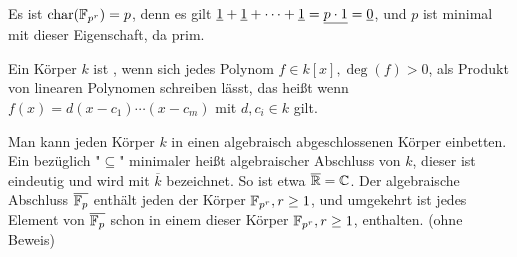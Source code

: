\begin{bem}
	Es ist $\operatorname{char}(\mathbb{F}_{p^r}) = p$, denn es gilt $\uline{1} + \uline{1} + \dots + \uline{1} = \uline{p \cdot 1} = \uline{0}$, und $p$ ist minimal mit dieser Eigenschaft, da prim.
\end{bem}

\begin{defn}
	Ein Körper $k$ ist , wenn sich jedes Polynom $f \in k[x], \deg(f) > 0$, als Produkt von linearen Polynomen schreiben lässt, das heißt wenn $f(x) = d(x-c_1) \cdots (x-c_m)$ mit $d,c_i \in k$ gilt.
\end{defn}

\begin{bem}
	Man kann jeden Körper $k$ in einen algebraisch abgeschlossenen Körper einbetten. Ein bezüglich "$\subseteq$" minimaler heißt algebraischer Abschluss von $k$, dieser ist eindeutig und wird mit $\overline{k}$ bezeichnet. So ist etwa $\overline{\mathbb{R}} = \mathbb{C}$. Der algebraische Abschluss $\overline{\mathbb{F}_p}$ enthält jeden der Körper $\mathbb{F}_{p^r}, r \geq 1$, und umgekehrt ist jedes Element von $\overline{\mathbb{F}_p}$ schon in einem dieser Körper $\mathbb{F}_{p^r}, r \geq 1$, enthalten. (ohne Beweis)
\end{bem}